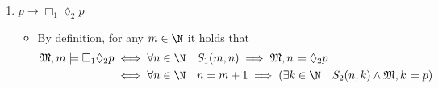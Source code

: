 \documentclass[a4paper, 12pt]{report}
\begin{document}
{\begin{enumerate}[label=(\alph*)]
\begin{itemize}
                    \item By definition, for any $s \in \mathbb B$ it holds that
                        \begin{equation*}
                            \begin{split}
                                \mathfrak M', s \models \lozenge_2 \Box_1 p &\iff \exists t \in \mathbb B \quad R_2(s, t) \land \mathfrak M', t \models \Box_1 p \\
                                                                            &\iff \exists t \in \mathbb B \quad t \sqsubset s \land (\forall u \in \mathbb B \quad R_1(t, u) \implies \mathfrak M', u \models p) \\
                                                                            &\iff \exists t \in \mathbb B \quad t \sqsubset s \land (\forall u \in \mathbb B \quad (u = t0 \lor u = t1) \implies u \in V(p)) \\
                                                                            &\iff \exists t \in \mathbb B \quad t \sqsubset s \land (t0 \in V(p) \lor t1 \in V(p))
                            \end{split}
                        \end{equation*}
                        Now take $s = \varepsilon \in \mathbb B$, and suppose $V(p) = \{s\} = \{\varepsilon\}$; then $s \in V(p) \iff \mathfrak M', s \models p$, however there is no $t \in \mathbb B$ such that $t \sqsubset s$, therefore $\nexists t \in \mathbb B \quad t \sqsubset s \land (t0 \in V(p) \lor t1 \in V(p)) \iff \mathfrak M', s \not\models \lozenge_2 \Box_1 p$ which implies that the formula is not valid on $\mathcal B$.
                \end{itemize}
            \item $p \rightarrow \Box_1 \lozenge_2 p$
                \begin{itemize}
                    \item By definition, for any $m \in \N$ it holds that
                        \begin{equation*}
                            \begin{split}
                                \mathfrak M, m \models \Box_1 \lozenge_2 p &\iff \forall n \in \N \quad S_1(m, n) \implies \mathfrak M, n \models \lozenge_2 p \\
                                                                         &\iff \forall n \in \N \quad n = m + 1 \implies (\exists k \in \N \quad S_2(n, k) \land \mathfrak M, k \models p) \\

\end{split}
\end{equation*}
\end{itemize}
\end{enumerate}}
\end{document}
